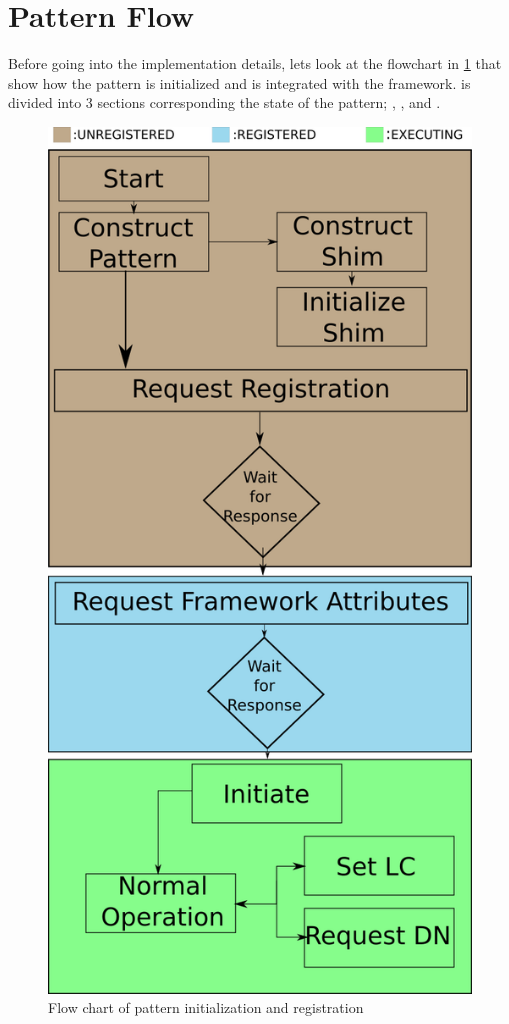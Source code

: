 \section{Pattern Flow}

Before going into the implementation details, lets look at the flowchart in \cref{fig:PatternFlowChart} that show how the pattern is initialized and is integrated with the framework.  is divided into 3 sections corresponding the state of the pattern; , , and .


\begin{figure}[t]
 \centering
 \includegraphics[width=0.4\linewidth]{figures/PatternFlowChart}
 \caption{Flow chart of pattern initialization and registration}
 \label{fig:PatternFlowChart}
\end{figure}



